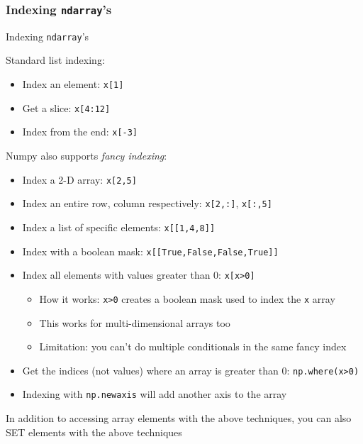 \documentclass{beamer}
\newcommand{\code}[1]{\texttt{#1}}
\begin{document}
\begin{frame}	
	\frametitle{Indexing \code{ndarray}'s}
	
	\begin{block}{Indexing \code{ndarray}'s}
		\begin{scriptsize}
		Standard list indexing:
		\begin{itemize}
			\item Index an element: \code{x[1]}
			\item Get a slice: \code{x[4:12]}
			\item Index from the end: \code{x[-3]}
		\end{itemize}
		
		Numpy also supports \emph{fancy indexing}:
		\begin{itemize}
			\item Index a 2-D array: \code{x[2,5]}
			\item Index an entire row, column respectively: \code{x[2,:]}, \code{x[:,5]}
			\item Index a list of specific elements: \code{x[[1,4,8]]}
			\item Index with a boolean mask: \code{x[[True,False,False,True]]}
			\item Index all elements with values greater than 0: \code{x[x>0]} \\
			\begin{itemize}
				\scriptsize
				\item How it works: \code{x>0} creates a boolean mask used to index the \code{x} array
				\item This works for multi-dimensional arrays too
				\item Limitation: you can't do multiple conditionals in the same fancy index
			\end{itemize}
			\item Get the indices (not values) where an array is greater than 0: \code{np.where(x>0)}
			\item Indexing with \code{np.newaxis} will add another axis to the array
		\end{itemize}
		In addition to accessing array elements with the above techniques, you can also SET elements with the above techniques
		\end{scriptsize}
	\end{block}
	
\end{frame}
\end{document}
